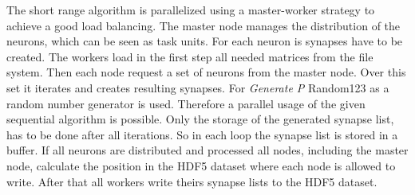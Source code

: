 The short range algorithm is parallelized using a master-worker strategy to achieve a good load balancing.
The master node manages the distribution of the neurons, which can be seen as task units. For each neuron 
is synapses have to be created. The workers load in the first step all needed matrices from the file system.
Then each node request a set of neurons from the master node. Over this set it iterates and creates resulting
synapses. For \emph{Generate P} Random123 as a random number generator is used. Therefore a parallel usage of 
the given sequential algorithm is possible. Only the storage of the generated synapse list, has to be done 
after all iterations. So in each loop the synapse list is stored in a buffer.
If all neurons are distributed and processed all nodes, including the master node, calculate the position in 
the HDF5 dataset where each node is allowed to write. After that all workers write theirs synapse lists to
the HDF5 dataset.


